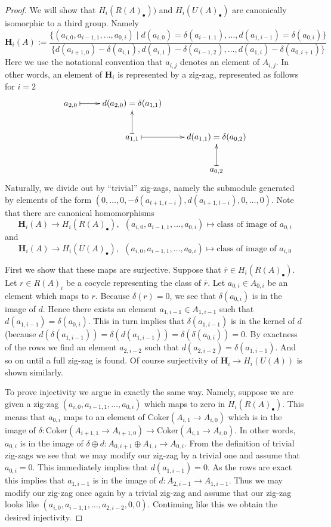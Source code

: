 \begin{proof}
We will show that $H_i(R(A)_\bullet))$
and $H_i(U(A)_\bullet)$ are canonically
isomorphic to a third group. Namely
$$
\mathbf{H}_i(A) :=
\frac{
\{
(a_{i, 0}, a_{i-1, 1}, \ldots, a_{0, i})
\mid
d(a_{i, 0}) = \delta(a_{i-1, 1}), \ldots,
d(a_{1, i-1}) = \delta(a_{0, i})
\}}
{
\{
d(a_{i + 1, 0}) - \delta(a_{i, 1}),
d(a_{i, 1}) - \delta(a_{i-1, 2}),
\ldots,
d(a_{1, i}) - \delta(a_{0, i + 1})
\}
}
$$
Here we use the notational convention that $a_{i, j}$ denotes
an element of $A_{i, j}$. In other words, an element of $\mathbf{H}_i$
is represented by a zig-zag, represented as follows for $i = 2$
$$
\xymatrix{
a_{2, 0} \ar@{|->}[r] & d(a_{2, 0}) = \delta(a_{1, 1}) & \cr
& a_{1, 1} \ar@{|->}[u] \ar@{|->}[r] & d(a_{1, 1}) = \delta(a_{0, 2}) \cr
& & a_{0, 2} \ar@{|->}[u] \cr
}
$$
Naturally, we divide out by ``trivial'' zig-zags, namely the submodule
generated by elements of the form $(0, \ldots, 0, -\delta(a_{t + 1, t-i}),
d(a_{t + 1, t-i}), 0, \ldots, 0)$. Note that there are canonical
homomorphisms
$$
\mathbf{H}_i(A) \to H_i(R(A)_\bullet), \ \ 
(a_{i, 0}, a_{i-1, 1}, \ldots, a_{0, i}) \mapsto
\text{class of image of }a_{0, i}
$$
and
$$
\mathbf{H}_i(A) \to H_i(U(A)_\bullet), \ \ 
(a_{i, 0}, a_{i-1, 1}, \ldots, a_{0, i}) \mapsto
\text{class of image of }a_{i, 0}
$$

\medskip\noindent
First we show that these maps are surjective.
Suppose that $\overline{r} \in H_i(R(A)_\bullet)$.
Let $r \in R(A)_i$ be a cocycle representing the
class of $\overline{r}$.
Let $a_{0, i} \in A_{0, i}$ be an element which
maps to $r$. Because $\delta(r) = 0$,
we see that $\delta(a_{0, i})$ is in the
image of $d$. Hence there exists an element
$a_{1, i-1} \in A_{1, i-1}$ such that
$d(a_{1, i-1}) = \delta(a_{0, i})$. This in turn
implies that $\delta(a_{1, i-1})$ is in the kernel
of $d$ (because $d(\delta(a_{1, i-1})) = \delta(d(a_{1, i-1}))
= \delta(\delta(a_{0, i})) = 0$. By exactness of the
rows we find an element $a_{2, i-2}$ such that
$d(a_{2, i-2}) = \delta(a_{1, i-1})$. And so on
until a full zig-zag is found. Of course surjectivity
of $\mathbf{H}_i \to H_i(U(A))$ is shown similarly.

\medskip\noindent
To prove injectivity we argue in exactly the same way.
Namely, suppose we are given a zig-zag
$(a_{i, 0}, a_{i-1, 1}, \ldots, a_{0, i})$
which maps to zero in $H_i(R(A)_\bullet)$.
This means that $a_{0, i}$ maps to an element
of $\text{Coker}(A_{i, 1} \to A_{i, 0})$
which is in the image of
$\delta : \text{Coker}(A_{i + 1, 1} \to A_{i + 1, 0}) \to
\text{Coker}(A_{i, 1} \to A_{i, 0})$.
In other words, $a_{0, i}$ is in the image of
$\delta \oplus d : A_{0, i + 1} \oplus A_{1, i} \to A_{0, i}$.
From the definition of trivial zig-zags we see that
we may modify our zig-zag by a trivial one and
assume that $a_{0, i} = 0$. This immediately
implies that $d(a_{1, i-1}) = 0$. As the rows
are exact this implies that $a_{1, i-1}$ is
in the image of $d : A_{2, i-1} \to A_{1, i-1}$.
Thus we may modify our zig-zag once again by a
trivial zig-zag and assume that our zig-zag looks
like $(a_{i, 0}, a_{i-1, 1}, \ldots, a_{2, i-2}, 0, 0)$.
Continuing like this we obtain the desired injectivity.


\end{proof}

